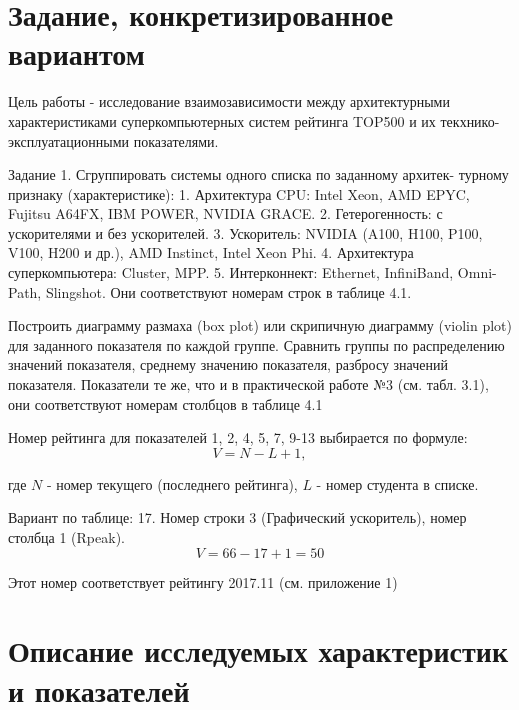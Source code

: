 \documentclass[14pt,a4paper]{extarticle}
\begin{document}
\section{Задание, конкретизированное вариантом}
\begin{sloppypar}
Цель работы - исследование взаимозависимости между архитектурными
    характеристиками суперкомпьютерных систем рейтинга TOP500 и их
    текхнико-эксплуатационными показателями.

    Задание 1. Сгруппировать системы одного списка по заданному архитек-
    турному признаку (характеристике):
    1. Архитектура CPU: Intel Xeon, AMD EPYC, Fujitsu A64FX, IBM POWER, NVIDIA GRACE.
    2. Гетерогенность: с ускорителями и без ускорителей.
    3. Ускоритель: NVIDIA (A100, H100, P100, V100, H200 и др.), AMD Instinct, Intel Xeon Phi.
    4. Архитектура суперкомпьютера: Cluster, MPP.
    5. Интерконнект: Ethernet, InfiniBand, Omni-Path, Slingshot.
    Они соответствуют номерам строк в таблице 4.1.

    Построить диаграмму размаха (box plot) или скрипичную диаграмму (violin
    plot) для заданного показателя по каждой группе. Сравнить группы по
    распределению значений показателя, среднему значению показателя, разбросу
    значений показателя. Показатели те же, что и в практической работе №3 (см.
    табл. 3.1), они соответствуют номерам столбцов в таблице 4.1

    Номер рейтинга для показателей 1, 2, 4, 5, 7, 9-13 выбирается по формуле:
    \[
        V = N - L + 1,
    \]
\end{sloppypar}

    где $N$ - номер текущего (последнего рейтинга),
        \newline\indent
        $L$ - номер студента в списке.

    Вариант по таблице: 17. \newline\indent
    Номер строки 3 (Графический ускоритель), номер столбца 1 (Rpeak).
    \[
        V = 66 - 17 + 1 = 50
    \]

    Этот номер соответствует рейтингу 2017.11 (см. приложение 1)
\newpage
\section{Описание исследуемых характеристик и показателей}
\end{document}
